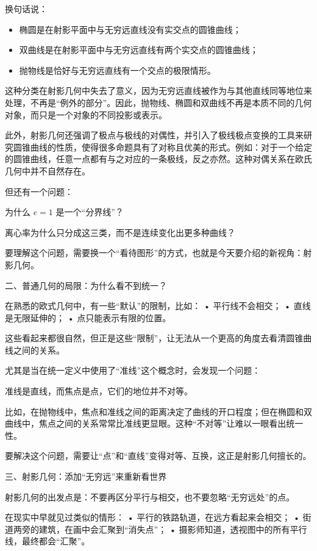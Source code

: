 换句话说：
\begin{itemize}
\item 椭圆是在射影平面中与无穷远直线没有实交点的圆锥曲线；
\item 双曲线是在射影平面中与无穷远直线有两个实交点的圆锥曲线；
\item 抛物线是恰好与无穷远直线有一个交点的极限情形。
\end{itemize}

这种分类在射影几何中失去了意义，因为无穷远直线被作为与其他直线同等地位来处理，不再是“例外的部分”。因此，抛物线、椭圆和双曲线不再是本质不同的几何对象，而只是一个对象的不同投影或表示。

此外，射影几何还强调了极点与极线的对偶性，并引入了极线极点变换的工具来研究圆锥曲线的性质，使得很多命题具有了对称且优美的形式。例如：对于一个给定的圆锥曲线，任意一点都有与之对应的一条极线，反之亦然。这种对偶关系在欧氏几何中并不自然存在。



但还有一个问题：

为什么 $e=1$ 是一个“分界线”？

离心率为什么只分成这三类，而不是连续变化出更多种曲线？

要理解这个问题，需要换一个“看待图形”的方式，也就是今天要介绍的新视角：射影几何。


二、普通几何的局限：为什么看不到统一？

在熟悉的欧式几何中，有一些“默认”的限制，比如：
	•	平行线不会相交；
	•	直线是无限延伸的；
	•	点只能表示有限的位置。

这些看起来都很自然，但正是这些“限制”，让无法从一个更高的角度去看清圆锥曲线之间的关系。

尤其是当在统一定义中使用了“准线”这个概念时，会发现一个问题：

准线是直线，而焦点是点，它们的地位并不对等。

比如，在抛物线中，焦点和准线之间的距离决定了曲线的开口程度；但在椭圆和双曲线中，焦点之间的关系常常比准线更显眼。这种“不对等”让难以一眼看出统一性。

要解决这个问题，需要让“点”和“直线”变得对等、互换，这正是射影几何擅长的。

三、射影几何：添加“无穷远”来重新看世界

射影几何的出发点是：不要再区分平行与相交，也不要忽略“无穷远处”的点。

在现实中早就见过类似的情形：
	•	平行的铁路轨道，在远方看起来会相交；
	•	街道两旁的建筑，在画中会汇聚到“消失点”；
	•	摄影师知道，透视图中的所有平行线，最终都会“汇聚”。

